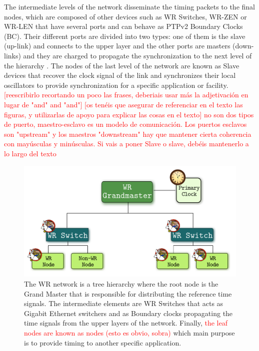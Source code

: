 The intermediate levels of the network disseminate the timing packets to the final 
nodes, which are composed of other devices such as WR Switches, WR-ZEN or WR-LEN 
that have several ports and can behave as PTPv2 Boundary Clocks (BC). Their 
different ports are divided into two types: one of them is the slave (up-link) 
and connects to the upper layer and the other ports are masters (down-links) 
and they are charged to propagate the synchronization to the next level of the 
hierarchy . The nodes of the last level of the network are known as Slave 
devices that recover the clock signal of the link and synchronizes their local 
oscillators to provide synchronization for a specific application or facility.
\textcolor{red}{[reescribirlo recortando un poco las frases, deberiais usar más la adjetivación en lugar de "and" and "and"]}
\textcolor{red}{[os tenéis que asegurar de referenciar en el texto las figuras, y utilizarlas de apoyo para explicar las cosas en el texto]}
\textcolor{red}{no son dos tipos de puerto, maestro-esclavo es un modelo de comunicación. Los puertos esclavos son "upstream" y los maestros "downstream"}
\textcolor{red}{hay que mantener cierta coherencia con mayúsculas y minúsculas. Si vais a poner Slave o slave, debéis mantenerlo a lo largo del texto}



\begin{figure}[H]
	\centering
	\includegraphics[scale=0.4]{img/wr_hierarchy}
	\caption{The WR network is a tree hierarchy where the root node is the Grand Master that is responsible for distributing the reference time signals. The intermediate elements are WR Switches that acts as Gigabit Ethernet switchers and as Boundary clocks propagating the time signals from the upper layers of the network. Finally, \textcolor{red}{the leaf nodes are known as nodes (esto es obvio, sobra)} which main purpose is to provide timing to another specific application.}
	\label{fig:wr_hierarchy}
\end{figure}



